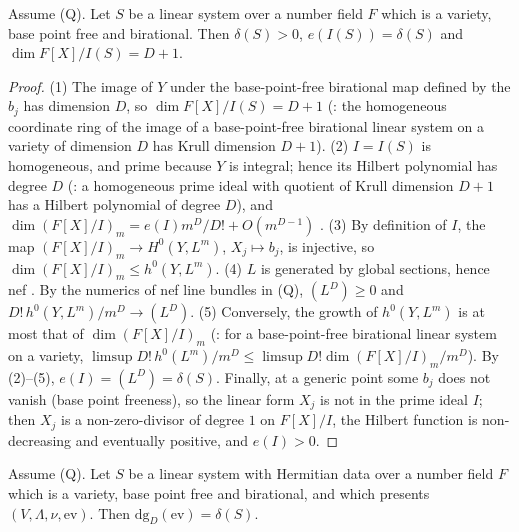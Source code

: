 \begin{proposition}\label{pf:lift2:degimage}
Assume \textup{(Q)}. Let $S$ be a linear system over a number field $F$ which is a variety, base point free and
birational. Then $\delta(S)>0$, $e(I(S))=\delta(S)$ and $\dim F[X]/I(S)=D+1$.
\end{proposition}

\begin{proof}
(1) The image of $Y$ under the base-point-free birational map defined by the $b_j$ has dimension $D$, so
$\dim F[X]/I(S)=D+1$ (: the homogeneous coordinate ring of
the image of a base-point-free birational linear system on a variety of dimension $D$ has Krull dimension $D+1$).
(2) $I=I(S)$ is homogeneous, and prime because $Y$ is integral; hence its Hilbert polynomial has degree $D$
(: a homogeneous prime ideal with quotient of Krull
dimension $D+1$ has a Hilbert polynomial of degree $D$), and $\dim(F[X]/I)_m=e(I)m^D/D!+O(m^{D-1})$
\cite[Ch.~2]{Fulton1998}.
(3) By definition of $I$, the map $(F[X]/I)_m\to H^0(Y,L^m)$, $X_j\mapsto b_j$, is injective, so
$\dim(F[X]/I)_m\le h^0(Y,L^m)$.
(4) $L$ is generated by global sections, hence nef \cite[1.4]{Lazarsfeld2004}. By the numerics of nef line bundles in
\textup{(Q)}, $(L^D)\ge0$ and $D!\,h^0(Y,L^m)/m^D\to(L^D)$.
(5) Conversely, the growth of $h^0(Y,L^m)$ is at most that of $\dim(F[X]/I)_m$
(: for a base-point-free birational
linear system on a variety, $\limsup D!\,h^0(L^m)/m^D\le\limsup D!\dim(F[X]/I)_m/m^D$).
By (2)--(5), $e(I)=(L^D)=\delta(S)$. Finally, at a generic point some $b_j$ does not vanish (base point freeness), so the
linear form $X_j$ is not in the prime ideal $I$; then $X_j$ is a non-zero-divisor of degree $1$ on $F[X]/I$, the Hilbert
function is non-decreasing and eventually positive, and $e(I)>0$.
\end{proof}

\begin{corollary}\label{pf:lift2:imagedeg}
Assume \textup{(Q)}. Let $S$ be a linear system with Hermitian data over a number field $F$ which is a variety, base point
free and birational, and which presents $(V,\Lambda,\nu,\mathrm{ev})$. Then $\mathrm{dg}_D(\mathrm{ev})=\delta(S)$.
\end{corollary}

